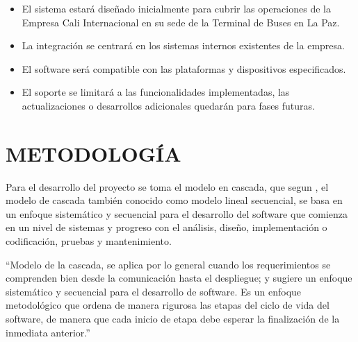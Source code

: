 \documentclass[12pt,letterpaper]{article}
\begin{document}
\begin{itemize}[label=$\bullet$, left=0cm, labelsep = 1.05cm, topsep = 0pt, parsep = 0pt]

	\item El sistema estará diseñado inicialmente para cubrir las operaciones de la Empresa Cali Internacional en su sede de la Terminal de Buses en La Paz.
	
	\item La integración se centrará en los sistemas internos existentes de la empresa. %
	
	\item El software será compatible con las plataformas y dispositivos especificados. %
	
	\item El soporte se limitará a las funcionalidades implementadas, las actualizaciones o desarrollos adicionales quedarán para fases futuras.

	
\end{itemize}


\section{METODOLOGÍA}

Para el desarrollo del proyecto se toma el modelo en cascada, que segun \cite{pressman1998ingenieria}, el modelo de cascada también conocido como modelo lineal secuencial, se basa en un enfoque sistemático y secuencial para el desarrollo del software que comienza en un nivel de sistemas y progreso con el análisis, diseño, implementación o codificación, pruebas y mantenimiento.

“Modelo de la cascada, se aplica por lo general cuando los requerimientos se
comprenden bien desde la comunicación hasta el despliegue; y sugiere un enfoque sistemático y secuencial para el desarrollo de software. Es un enfoque metodológico que ordena de manera rigurosa las etapas del ciclo de vida del software, de manera que cada inicio de etapa debe esperar la finalización de la inmediata anterior.” \parencite{pressman2010ingenieria}
\end{document}
